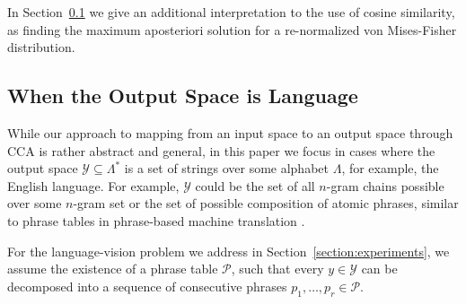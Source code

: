 \documentclass[letterpaper]{article}
\newcommand{\outy}{\mathcal{Y}}
\newcommand{\phrasetable}{\mathcal{P}}
\begin{document}
In Section~\ref{section:decoding} we give an additional interpretation to the use of cosine similarity,
as finding the maximum aposteriori solution for a re-normalized von Mises-Fisher distribution.

\subsection{When the Output Space is Language}
\label{section:decoding}

While our approach to mapping from an input space to an output space through CCA is rather abstract and
general, in this paper we focus in cases where the output space $\outy \subseteq \Lambda^{\ast}$ is a set of strings over
some alphabet $\Lambda$, for example, the English language. For example, $\outy$ could be the set of all $n$-gram chains
possible over some $n$-gram set or the set of possible composition of atomic phrases, similar to phrase tables
in phrase-based machine translation \cite{koehn2007moses}.

For the language-vision problem we address in Section~\ref{section:experiments}, we assume the existence of a phrase table $\phrasetable$,
such that every $y \in \outy$ can be decomposed into a sequence of consecutive phrases $p_1,\ldots,p_r \in \phrasetable$.
\end{document}
